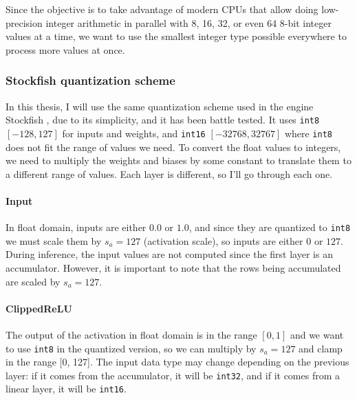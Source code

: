 Since the objective is to take advantage of modern CPUs that allow doing low-precision integer arithmetic in parallel with 8, 16, 32, or even 64 8-bit integer values at a time, we want to use the smallest integer type possible everywhere to process more values at once.

\newpage
\subsubsection{Stockfish quantization scheme}

\def\int#1{\texttt{int#1}}

In this thesis, I will use the same quantization scheme used in the engine Stockfish \cite{nnue-pytorch}, due to its simplicity, and it has been battle tested. It uses \int{8} $[-128, 127]$ for inputs and weights, and \int{16} $[-32768, 32767]$ where \int{8} does not fit the range of values we need.
To convert the float values to integers, we need to multiply the weights and biases by some constant to translate them to a different range of values. Each layer is different, so I'll go through each one.


\paragraph[short]{Input} In float domain, inputs are either $0.0$ or $1.0$, and since they are quantized to \int{8} we must scale them by $s_a=127$ (activation scale), so inputs are either $0$ or $127$. During inference, the input values are not computed since the first layer is an accumulator. However, it is important to note that the rows being accumulated are scaled by $s_a=127$.

\paragraph[short]{ClippedReLU} The output of the activation in float domain is in the range $[0, 1]$ and we want to use \int{8} in the quantized version, so we can multiply by $s_a=127$ and clamp in the range [0, 127]. The input data type may change depending on the previous layer: if it comes from the accumulator, it will be \int{32}, and if it comes from a linear layer, it will be \int{16}.

